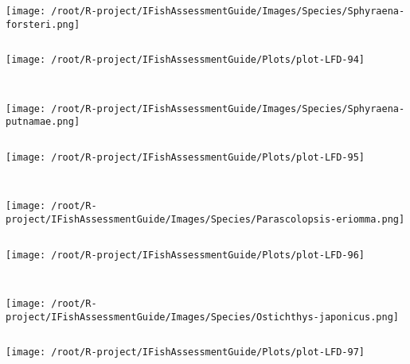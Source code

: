 \documentclass{report}\usepackage[]{graphicx}\usepackage[]{color}
\makeatletter
\def\maxwidth{ %
  \ifdim\Gin@nat@width>\linewidth
    \linewidth
  \else
    \Gin@nat@width
  \fi
}
\newenvironment{kframe}{%
 \def\at@end@of@kframe{}%
 \ifinner\ifhmode%
  \def\at@end@of@kframe{\end{minipage}}%
  \begin{minipage}{\columnwidth}%
 \fi\fi%
 \def\FrameCommand##1{\hskip\@totalleftmargin \hskip-\fboxsep
 \colorbox{shadecolor}{##1}\hskip-\fboxsep
     \hskip-\linewidth \hskip-\@totalleftmargin \hskip\columnwidth}%
 \MakeFramed {\advance\hsize-\width
   \@totalleftmargin\z@ \linewidth\hsize
   \@setminipage}}%
 {\par\unskip\endMakeFramed%
 \at@end@of@kframe}
\newenvironment{knitrout}{}{} %
\makeatother
\begin{document}
\begin{knitrout}
\begin{kframe}
\begin{verbatim}
\end{verbatim}
\end{kframe}
\texttt{[image: /root/R-project/IFishAssessmentGuide/Images/Species/Sphyraena-forsteri.png]}
\begin{kframe}\begin{verbatim}
\end{verbatim}
\end{kframe}
\texttt{[image: /root/R-project/IFishAssessmentGuide/Plots/plot-LFD-94]} 
\begin{kframe}\begin{verbatim}
 
\end{verbatim}
\end{kframe}
\texttt{[image: /root/R-project/IFishAssessmentGuide/Images/Species/Sphyraena-putnamae.png]}
\begin{kframe}\begin{verbatim}
\end{verbatim}
\end{kframe}
\texttt{[image: /root/R-project/IFishAssessmentGuide/Plots/plot-LFD-95]} 
\begin{kframe}\begin{verbatim}
 
\end{verbatim}
\end{kframe}
\texttt{[image: /root/R-project/IFishAssessmentGuide/Images/Species/Parascolopsis-eriomma.png]}
\begin{kframe}\begin{verbatim}
\end{verbatim}
\end{kframe}
\texttt{[image: /root/R-project/IFishAssessmentGuide/Plots/plot-LFD-96]} 
\begin{kframe}\begin{verbatim}
 
\end{verbatim}
\end{kframe}
\texttt{[image: /root/R-project/IFishAssessmentGuide/Images/Species/Ostichthys-japonicus.png]}
\begin{kframe}\begin{verbatim}
\end{verbatim}
\end{kframe}
\texttt{[image: /root/R-project/IFishAssessmentGuide/Plots/plot-LFD-97]} 
\begin{kframe}\begin{verbatim}
 

\end{verbatim}
\end{kframe}
\end{knitrout}
\end{document}
